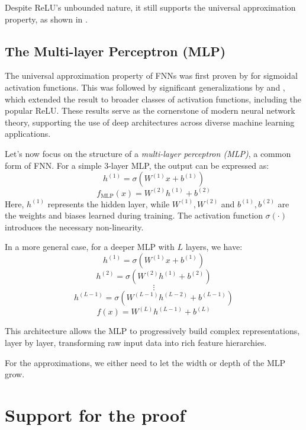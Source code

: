 \documentclass{article}
\theoremstyle{definition}
\theoremstyle{remark}
\begin{document}
Despite ReLU's unbounded nature, it still supports the universal approximation property, as shown in \citep{yarotsky2017error}.



\subsection{The Multi-layer Perceptron (MLP)}

The universal approximation property of FNNs was first proven by \citep{cybenko1989approximation} for sigmoidal activation functions. This was followed by significant generalizations by \citep{hornik1989multilayer} and \citep{funahashi1989approximate}, which extended the result to broader classes of activation functions, including the popular ReLU.
These results serve as the cornerstone of modern neural network theory, supporting the use of deep architectures across diverse machine learning applications.


Let’s now focus on the structure of a \textit{multi-layer perceptron (MLP)}, a common form of FNN. For a simple 3-layer MLP, the output can be expressed as:
\[
h^{(1)} = \sigma(W^{(1)} x + b^{(1)})
\]
\[
f_{\text{MLP}}(x) = W^{(2)} h^{(1)} + b^{(2)}
\]
Here, \(h^{(1)}\) represents the hidden layer, while \(W^{(1)}, W^{(2)}\) and \(b^{(1)}, b^{(2)}\) are the weights and biases learned during training. The activation function \(\sigma(\cdot)\) introduces the necessary non-linearity.




In a more general case, for a deeper MLP with \(L\) layers, we have:
\[
h^{(1)} = \sigma(W^{(1)} x + b^{(1)})
\]
\[
h^{(2)} = \sigma(W^{(2)} h^{(1)} + b^{(2)})
\]
\[
\vdots
\]
\[
h^{(L-1)} = \sigma(W^{(L-1)} h^{(L-2)} + b^{(L-1)})
\]
\[
f(x) = W^{(L)} h^{(L-1)} + b^{(L)}
\]

This architecture allows the MLP to progressively build complex representations, layer by layer, transforming raw input data into rich feature hierarchies.


For the approximations, we either need to let the width or depth of the MLP grow.

\section{Support for the proof}
\end{document}
